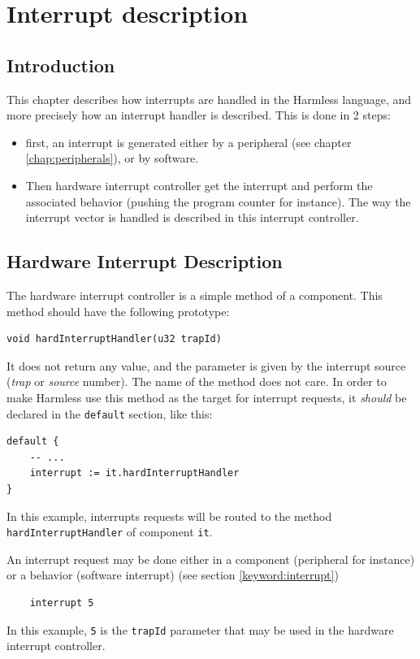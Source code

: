 
\chapter{Interrupt description}
\label{chap:interrupt}
\section{Introduction}
This chapter describes how interrupts are handled in the Harmless language, and more precisely how an interrupt handler is described. This is done in 2 steps:
\begin{itemize}
\item first, an interrupt is generated either by a peripheral (see chapter \ref{chap:peripherals}), or by software.
\item Then hardware interrupt controller get the interrupt and perform the associated behavior (pushing the program counter for instance). The way the interrupt vector is handled is described in this interrupt controller.
\end{itemize}

\section{Hardware Interrupt Description}
The hardware interrupt controller is a simple method of a component. This method should have the following prototype:
\begin{lstlisting}
void hardInterruptHandler(u32 trapId)
\end{lstlisting}
It does not return any value, and the parameter is given by the interrupt source (\emph{trap} or \emph{source} number). The name of the method does not care. In order to make Harmless use this method as the target for interrupt requests, it \emph{should} be declared in the \texttt{default} section, like this:
\begin{lstlisting}
default {
    -- ...
    interrupt := it.hardInterruptHandler
}
\end{lstlisting}
In this example, interrupts requests will be routed to the method \texttt{hardInterruptHandler} of component \texttt{it}.

An interrupt request may be done either in a component (peripheral for instance) or a behavior (software interrupt) (see section \ref{keyword:interrupt})
\begin{lstlisting}
    interrupt 5
\end{lstlisting}
In this example, \texttt{5} is the \texttt{trapId} parameter that may be used in the hardware interrupt controller.
